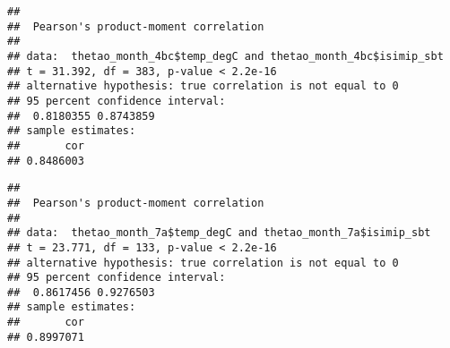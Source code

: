 \documentclass[
]{article}
\newenvironment{Shaded}{\begin{snugshade}}{\end{snugshade}}
\newcommand{\CommentTok}[1]{\textcolor[rgb]{0.56,0.35,0.01}{\textit{#1}}}
\newcommand{\FunctionTok}[1]{\textcolor[rgb]{0.00,0.00,0.00}{#1}}
\newcommand{\NormalTok}[1]{#1}
\newcommand{\OtherTok}[1]{\textcolor[rgb]{0.56,0.35,0.01}{#1}}
\newcommand{\SpecialCharTok}[1]{\textcolor[rgb]{0.00,0.00,0.00}{#1}}
\newcommand{\StringTok}[1]{\textcolor[rgb]{0.31,0.60,0.02}{#1}}
\begin{document}
\begin{Shaded}
\end{Shaded}

\begin{verbatim}
## 
##  Pearson's product-moment correlation
## 
## data:  thetao_month_4bc$temp_degC and thetao_month_4bc$isimip_sbt
## t = 31.392, df = 383, p-value < 2.2e-16
## alternative hypothesis: true correlation is not equal to 0
## 95 percent confidence interval:
##  0.8180355 0.8743859
## sample estimates:
##       cor 
## 0.8486003
\end{verbatim}

\begin{Shaded}
\end{Shaded}

\begin{verbatim}
## 
##  Pearson's product-moment correlation
## 
## data:  thetao_month_7a$temp_degC and thetao_month_7a$isimip_sbt
## t = 23.771, df = 133, p-value < 2.2e-16
## alternative hypothesis: true correlation is not equal to 0
## 95 percent confidence interval:
##  0.8617456 0.9276503
## sample estimates:
##       cor 
## 0.8997071
\end{verbatim}

\begin{Shaded}
\end{Shaded}
\end{document}
